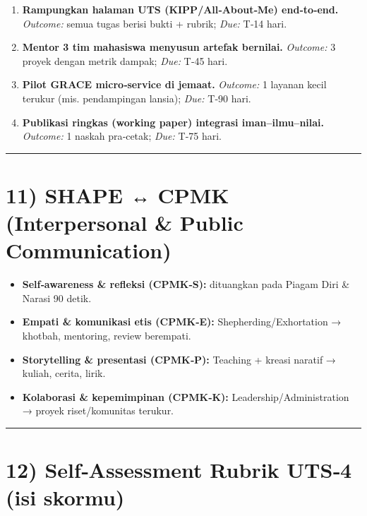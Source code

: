 \documentclass[
  letterpaper,
  DIV=11,
  numbers=noendperiod]{scrreprt}
\providecommand{\tightlist}{%
  \setlength{\itemsep}{0pt}\setlength{\parskip}{0pt}}
\begin{document}
\begin{enumerate}
\def\labelenumi{\arabic{enumi}.}
\tightlist
\item
  \textbf{Rampungkan halaman UTS (KIPP/All‑About‑Me) end‑to‑end.}
  \emph{Outcome:} semua tugas berisi bukti + rubrik; \emph{Due:} T‑14
  hari.
\item
  \textbf{Mentor 3 tim mahasiswa menyusun artefak bernilai.}
  \emph{Outcome:} 3 proyek dengan metrik dampak; \emph{Due:} T‑45 hari.
\item
  \textbf{Pilot GRACE micro‑service di jemaat.} \emph{Outcome:} 1
  layanan kecil terukur (mis. pendampingan lansia); \emph{Due:} T‑90
  hari.
\item
  \textbf{Publikasi ringkas (working paper) integrasi
  iman--ilmu--nilai.} \emph{Outcome:} 1 naskah pra‑cetak; \emph{Due:}
  T‑75 hari.
\end{enumerate}

\begin{center}\rule{0.5\linewidth}{0.5pt}\end{center}

\section{11) SHAPE ↔ CPMK (Interpersonal \& Public
Communication)}\label{shape-cpmk-interpersonal-public-communication}

\begin{itemize}
\tightlist
\item
  \textbf{Self‑awareness \& refleksi (CPMK‑S):} dituangkan pada Piagam
  Diri \& Narasi 90 detik.
\item
  \textbf{Empati \& komunikasi etis (CPMK‑E):} Shepherding/Exhortation →
  khotbah, mentoring, review berempati.
\item
  \textbf{Storytelling \& presentasi (CPMK‑P):} Teaching + kreasi
  naratif → kuliah, cerita, lirik.
\item
  \textbf{Kolaborasi \& kepemimpinan (CPMK‑K):}
  Leadership/Administration → proyek riset/komunitas terukur.
\end{itemize}

\begin{center}\rule{0.5\linewidth}{0.5pt}\end{center}

\section{12) Self‑Assessment Rubrik UTS‑4 (isi
skormu)}\label{selfassessment-rubrik-uts4-isi-skormu}
\end{document}
